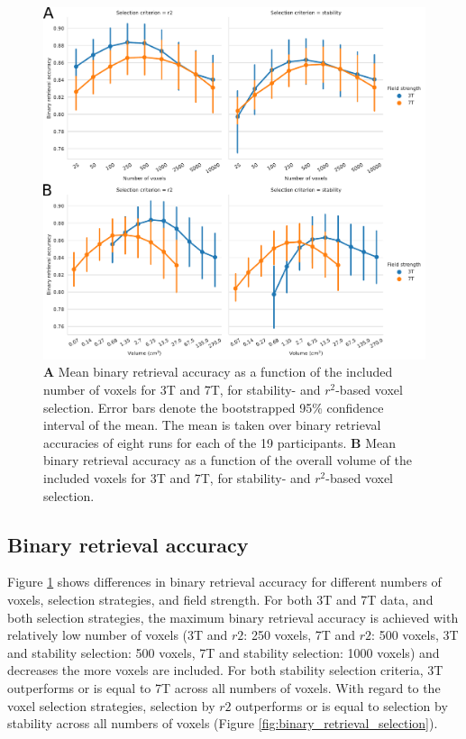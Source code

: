 \begin{figure}
  \centering
  \includegraphics[width=\linewidth]{pics/binary.pdf}
	
  \caption{\textbf{A} Mean binary retrieval accuracy as a function of the
  included number of voxels for 3T and 7T, for stability- and $r^2$-based
  voxel selection. Error bars denote the bootstrapped 95\% confidence interval
  of the mean. The mean is taken over binary retrieval accuracies of eight runs
  for each of the 19 participants. \textbf{B} Mean binary retrieval accuracy as
a function of the overall volume of the included voxels for 3T and 7T, for
stability- and $r^2$-based voxel selection.
}

 \label{fig:binary_retrieval}\end{figure}

\subsection*{Binary retrieval accuracy}

Figure \ref{fig:binary_retrieval} shows differences in binary retrieval accuracy
for different numbers of voxels, selection strategies, and field strength.
For both 3T and 7T data, and both selection strategies, the maximum binary
retrieval accuracy is achieved with relatively low number of voxels (3T and
$r2$: 250 voxels, 7T and $r2$: 500 voxels, 3T and stability selection: 500
voxels, 7T and stability selection: 1000 voxels) and decreases the more voxels are
included.
For both stability selection criteria, 3T outperforms or is equal to 7T across
all numbers of voxels.
With regard to the voxel selection strategies, selection by $r2$ outperforms or
is equal to selection by stability across all numbers of voxels (Figure
\ref{fig:binary_retrieval_selection}).

